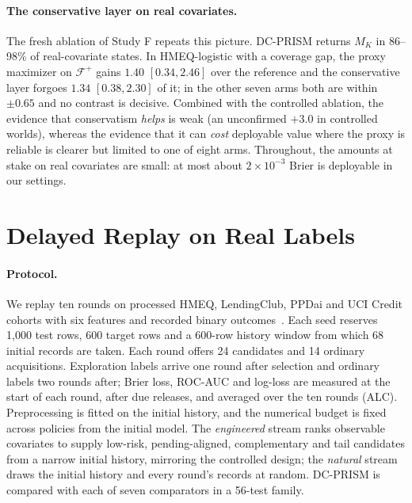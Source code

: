 \documentclass[runningheads]{llncs}
\begin{document}
\paragraph{The conservative layer on real covariates.} The fresh ablation of Study F repeats this picture. DC-PRISM returns $M_K$ in 86--98\% of real-covariate states. In HMEQ-logistic with a coverage gap, the proxy maximizer on $\mathcal F^+$ gains $1.40$ $[0.34,2.46]$ over the reference and the conservative layer forgoes $1.34$ $[0.38,2.30]$ of it; in the other seven arms both are within $\pm0.65$ and no contrast is decisive. Combined with the controlled ablation, the evidence that conservatism \emph{helps} is weak (an unconfirmed $+3.0$ in controlled worlds), whereas the evidence that it can \emph{cost} deployable value where the proxy is reliable is clearer but limited to one of eight arms. Throughout, the amounts at stake on real covariates are small: at most about $2\times10^{-3}$ Brier is deployable in our settings.

\section{Delayed Replay on Real Labels}
\label{sec:replay}
\paragraph{Protocol.} We replay ten rounds on processed HMEQ, LendingClub, PPDai and UCI Credit cohorts with six features and recorded binary outcomes~\cite{sasHMEQ,lendingclubSource,ppdaiSource,he2018ensemble,yeh2009comparison}. Each seed reserves 1{,}000 test rows, 600 target rows and a 600-row history window from which 68 initial records are taken. Each round offers 24 candidates and 14 ordinary acquisitions. Exploration labels arrive one round after selection and ordinary labels two rounds after; Brier loss, ROC-AUC and log-loss are measured at the start of each round, after due releases, and averaged over the ten rounds (ALC). Preprocessing is fitted on the initial history, and the numerical budget is fixed across policies from the initial model. The \emph{engineered} stream ranks observable covariates to supply low-risk, pending-aligned, complementary and tail candidates from a narrow initial history, mirroring the controlled design; the \emph{natural} stream draws the initial history and every round's records at random. DC-PRISM is compared with each of seven comparators in a 56-test family.
\end{document}
